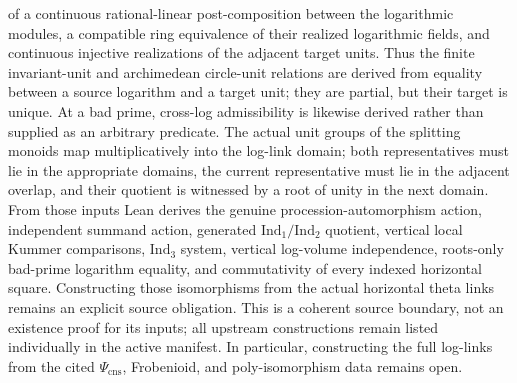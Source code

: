 \documentclass[11pt]{article}
\newcommand{\IndOne}{\ensuremath{\mathrm{Ind}_1}}
\newcommand{\IndTwo}{\ensuremath{\mathrm{Ind}_2}}
\newcommand{\IndThree}{\ensuremath{\mathrm{Ind}_3}}
\theoremstyle{plain}
\theoremstyle{definition}
\theoremstyle{remark}
\begin{document}
of a continuous rational-linear
post-composition between the logarithmic modules, a compatible ring
equivalence of their realized logarithmic fields, and continuous injective
realizations of the adjacent target units.  Thus the finite invariant-unit and
archimedean circle-unit relations are derived from equality between a source
logarithm and a target unit; they are partial, but their target is unique.
At a bad prime, cross-log admissibility is likewise derived rather than
supplied as an arbitrary predicate.  The actual unit groups of the splitting
monoids map multiplicatively into the log-link domain; both representatives
must lie in the appropriate domains, the current representative must lie in
the adjacent overlap, and their quotient is witnessed by a root of unity in
the next domain.
From those inputs Lean derives the genuine
procession-automorphism action, independent summand action, generated
\(\IndOne/\IndTwo\) quotient, vertical local Kummer comparisons,
\(\IndThree\) system, vertical log-volume independence, roots-only bad-prime
logarithm equality, and commutativity of every indexed horizontal square.
Constructing those isomorphisms from the actual horizontal theta links remains
an explicit source obligation.  This is a
coherent source boundary, not an existence proof for its inputs; all upstream
constructions remain listed individually in the active manifest.  In
particular, constructing the full log-links from the cited
\(\Psi_{\mathrm{cns}}\), Frobenioid, and poly-isomorphism data remains open.
\end{document}
